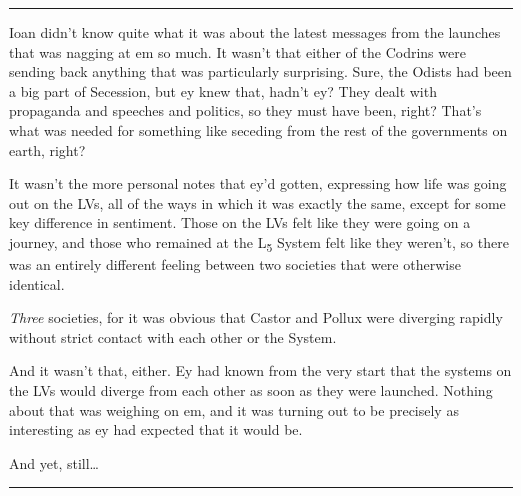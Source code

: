\begin{center}\rule{0.5\linewidth}{0.5pt}\end{center}

\noindent Ioan didn't know quite what it was about the latest messages from the launches that was nagging at em so much. It wasn't that either of the Codrins were sending back anything that was particularly surprising. Sure, the Odists had been a big part of Secession, but ey knew that, hadn't ey? They dealt with propaganda and speeches and politics, so they must have been, right? That's what was needed for something like seceding from the rest of the governments on earth, right?

It wasn't the more personal notes that ey'd gotten, expressing how life was going out on the LVs, all of the ways in which it was exactly the same, except for some key difference in sentiment. Those on the LVs felt like they were going on a journey, and those who remained at the L\textsubscript{5} System felt like they weren't, so there was an entirely different feeling between two societies that were otherwise identical.

\emph{Three} societies, for it was obvious that Castor and Pollux were diverging rapidly without strict contact with each other or the System.

And it wasn't that, either. Ey had known from the very start that the systems on the LVs would diverge from each other as soon as they were launched. Nothing about that was weighing on em, and it was turning out to be precisely as interesting as ey had expected that it would be.

And yet, still\ldots{}

\begin{center}\rule{0.5\linewidth}{0.5pt}\end{center}

